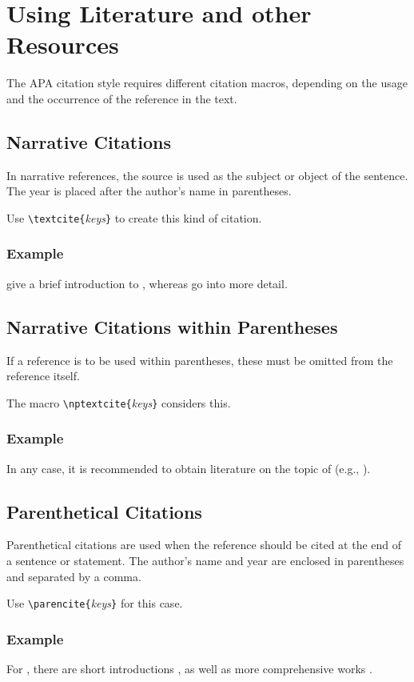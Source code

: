 \chapter[Using Literature]{Using Literature and other Resources}
\label{cha:Literature}

The APA citation style requires different citation macros, depending on the usage and the
occurrence of the reference in the text.

\section{Narrative Citations}

In narrative references, the source is used as the subject or object of the sentence. The
year is placed after the author's name in parentheses.

Use \verb!\textcite{!\textit{keys}\verb!}! to create this kind of citation.

\subsection{Example}

\textcite{Daniel2018} give a brief introduction to \latex, whereas \textcite{Oetiker2018, Kopka2003} go into more detail.

\section{Narrative Citations within Parentheses}

If a reference is to be used within parentheses, these must be omitted from the reference itself.

The macro \verb!\nptextcite{!\textit{keys}\verb!}! considers this.

\subsection{Example}

In any case, it is recommended to obtain literature on the topic of \latex (e.g., ).

\section{Parenthetical Citations}

Parenthetical citations are used when the reference should be cited at the end of a sentence or statement.
The author's name and year are enclosed in parentheses and separated by a comma.

Use \verb!\parencite{!\textit{keys}\verb!}! for this case.

\subsection{Example}

For \latex, there are short introductions \parencite{Daniel2018}, as well as more comprehensive works \parencite{Oetiker2018, Kopka2003}.



